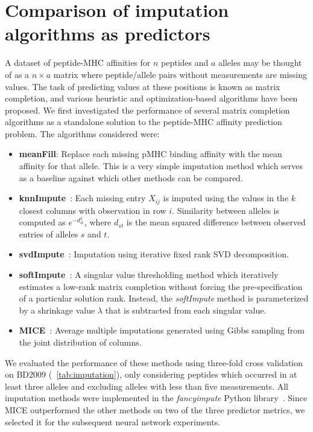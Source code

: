 \section{Comparison of imputation algorithms as predictors}

A dataset of peptide-MHC affinities for $n$ peptides and $a$ alleles may be thought of as a $n \times a$ matrix where peptide/allele pairs without measurements are missing values. The task of predicting values at these positions is known as matrix completion, and various heuristic and optimization-based algorithms have been proposed. We first investigated the performance of several matrix completion algorithms as a standalone solution to the peptide-MHC affinity prediction problem. The algorithms considered were:

\begin{itemize}
\item {\bf meanFill}: Replace each missing pMHC binding affinity with the mean affinity for that allele. This is a very simple imputation method which serves as a baseline against which other methods can be compared. 

\item {\bf knnImpute}~\cite{Troyanskaya_2001}: Each missing entry $X_{ij}$ is imputed using the values in the $k$ closest columns with observation in row $i$.  Similarity between alleles is computed as $e^{-d_{st}^2}$, where $d_{st}$ is the mean squared difference between observed entries of alleles $s$ and $t$. 

\item {\bf svdImpute}~\cite{Troyanskaya_2001}: Imputation using iterative fixed rank SVD decomposition. 

\item {\bf softImpute}~\cite{Mazumder2010SpectralMatrices}: A singular value thresholding method which iteratively estimates a low-rank matrix completion without forcing the pre-specification of a particular solution rank. Instead, the {\it softImpute} method is parameterized by a shrinkage value $\lambda$ that is subtracted from each singular value. 

\item {\bf MICE}~\cite{Azur_2011}: Average multiple imputations generated using Gibbs sampling from the joint distribution of columns. 
\end{itemize}

We evaluated the performance of these methods using three-fold cross validation on BD2009 (~\ref{tab:imputation}), only considering peptides which occurred in at least three alleles and excluding alleles with less than five measurements. All imputation methods were implemented in the \textit{fancyimpute} Python library~\cite{fancyimpute-0-0-16}. Since MICE outperformed the other methods on two of the three predictor metrics, we selected it for the subsequent neural network experiments.

